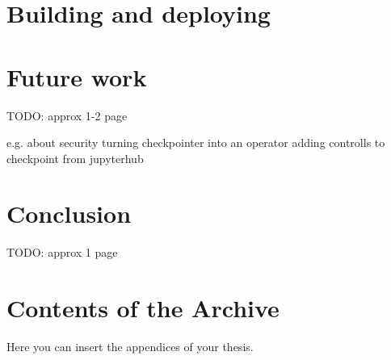 \documentclass[
  digital,     %
  oneside,     %
  nosansbold,  %
  nocolorbold, %
  lof,         %
  lot,         %
]{fithesis4}
\begin{document}
\chapter{Building and deploying}



\chapter{Future work}
TODO: approx 1-2 page

e.g. about security 
turning checkpointer into an operator
adding controlls to checkpoint from jupyterhub

\chapter{Conclusion}
TODO: approx 1 page

\printbibliography[heading=bibintoc] %



\appendix %
\chapter{Contents of the Archive}
\label{apendix}
Here you can insert the appendices of your thesis.
\end{document}
